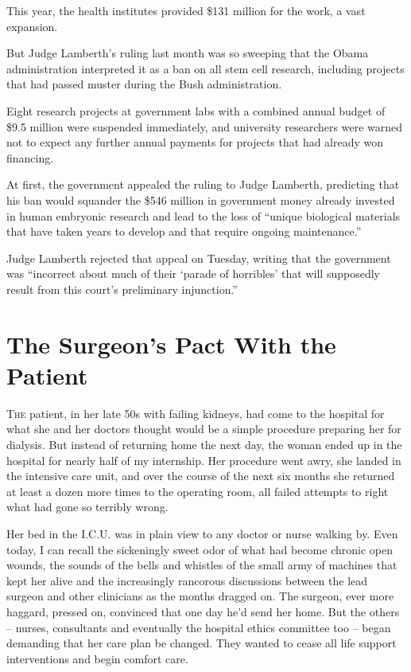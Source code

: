 ﻿\documentclass[12pt]{article}
\begin{document}
This year, the health institutes provided \$131 million for the work, a vast expansion.

But Judge Lamberth's ruling last month was so sweeping that the Obama administration interpreted it
as a ban on all stem cell research, including projects that had passed muster during the Bush
administration.

Eight research projects at government labs with a combined annual budget of \$9.5 million were
suspended immediately, and university researchers were warned not to expect any further annual
payments for projects that had already won financing.

At first, the government appealed the ruling to Judge Lamberth, predicting that his ban would
squander the \$546 million in government money already invested in human embryonic research and lead
to the loss of ``unique biological materials that have taken years to develop and that require
ongoing maintenance.''

Judge Lamberth rejected that appeal on Tuesday, writing that the government was ``incorrect about
much of their `parade of horribles' that will supposedly result from this court's preliminary
injunction.''

\pagebreak
\section{The Surgeon's Pact With the Patient}

\lettrine{T}{he} patient, in her late 50s with failing kidneys, had come to
the hospital for what she and her doctors thought would be a simple procedure preparing her for
dialysis. But instead of returning home the next day, the woman ended up in the hospital for nearly
half of my internship. Her procedure went awry, she landed in the intensive care unit, and over the
course of the next six months she returned at least a dozen more times to the operating room, all
failed attempts to right what had gone so terribly wrong.

Her bed in the I.C.U. was in plain view to any doctor or nurse walking by. Even today, I can recall
the sickeningly sweet odor of what had become chronic open wounds, the sounds of the bells and
whistles of the small army of machines that kept her alive and the increasingly rancorous
discussions between the lead surgeon and other clinicians as the months dragged on. The surgeon,
ever more haggard, pressed on, convinced that one day he'd send her home. But the others -- nurses,
consultants and eventually the hospital ethics committee too -- began demanding that her care plan
be changed. They wanted to cease all life support interventions and begin comfort care.
\end{document}
